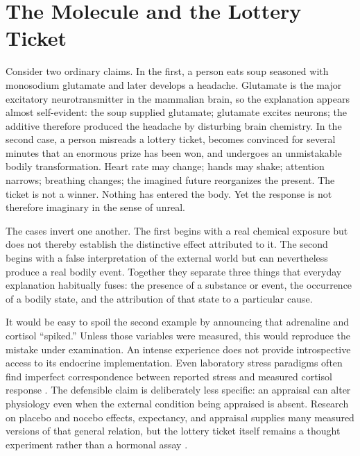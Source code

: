 \documentclass[11pt]{article}
\begin{document}
\tableofcontents
\newpage

\section{The Molecule and the Lottery Ticket}

Consider two ordinary claims. In the first, a person eats soup seasoned with monosodium glutamate and later develops a headache. Glutamate is the major excitatory neurotransmitter in the mammalian brain, so the explanation appears almost self-evident: the soup supplied glutamate; glutamate excites neurons; the additive therefore produced the headache by disturbing brain chemistry. In the second case, a person misreads a lottery ticket, becomes convinced for several minutes that an enormous prize has been won, and undergoes an unmistakable bodily transformation. Heart rate may change; hands may shake; attention narrows; breathing changes; the imagined future reorganizes the present. The ticket is not a winner. Nothing has entered the body. Yet the response is not therefore imaginary in the sense of unreal.

The cases invert one another. The first begins with a real chemical exposure but does not thereby establish the distinctive effect attributed to it. The second begins with a false interpretation of the external world but can nevertheless produce a real bodily event. Together they separate three things that everyday explanation habitually fuses: the presence of a substance or event, the occurrence of a bodily state, and the attribution of that state to a particular cause.

It would be easy to spoil the second example by announcing that adrenaline and cortisol ``spiked.'' Unless those variables were measured, this would reproduce the mistake under examination. An intense experience does not provide introspective access to its endocrine implementation. Even laboratory stress paradigms often find imperfect correspondence between reported stress and measured cortisol response 
\citep{campbell2012psychological,becker2023stress}. The defensible claim is deliberately less specific: an appraisal can alter physiology even when the external condition being appraised is absent. Research on placebo and nocebo effects, expectancy, and appraisal supplies many measured versions of that general relation, but the lottery ticket itself remains a thought experiment rather than a hormonal assay 
\citep{benedetti2011placebo,ashar2017placebo}.
\end{document}
